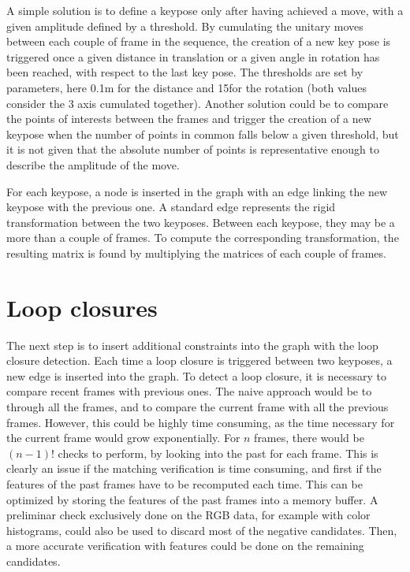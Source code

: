 A simple solution is to define a keypose only after having achieved a move, with a given amplitude defined by a threshold. By cumulating the unitary moves between each couple of frame in the sequence, the creation of a new key pose is triggered once a given distance in translation or a given angle in rotation has been reached,  with respect to the last key pose. The thresholds are set by parameters, here 0.1m for the distance and 15\textdegree for the rotation (both values consider the 3 axis cumulated together). Another solution could be to compare the points of interests between the frames and trigger the creation of a new keypose when the number of points in common falls below a given threshold, but it is not given that the absolute number of points is representative enough to describe the amplitude of the move.

For each keypose, a node is inserted in the graph with an edge linking the new keypose with the previous one. A standard edge represents the rigid transformation between the two keyposes. Between each keypose, they may be a more than a couple of frames. To compute the corresponding transformation, the resulting matrix is found by multiplying the matrices of each couple of frames.

\section{Loop closures}

The next step is to insert additional constraints into the graph with the loop closure detection. Each time a loop closure is triggered between two keyposes, a new edge is inserted into the graph. To detect a loop closure, it is necessary to compare recent frames with previous ones. The naive approach would be to through all the frames, and to compare the current frame with all the previous frames. However, this could be highly time consuming, as the time necessary for the current frame would grow exponentially. For $n$ frames, there would be $(n-1)!$ checks to perform, by looking into the past for each frame. This is clearly an issue if the matching verification is time consuming, and first if the features of the past frames have to be recomputed each time. This can be optimized by storing the features of the past frames into a memory buffer. A preliminar check exclusively done on the RGB data, for example with color histograms, could also be used to discard most of the negative candidates. Then, a more accurate verification with features could be done on the remaining candidates.

